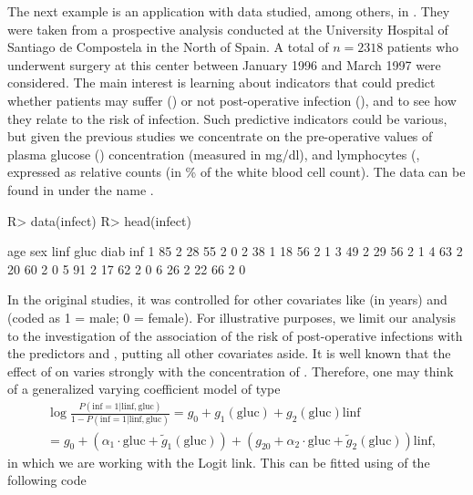 The next example is an application with data studied, among others, in \citet{RS2010}. 
They were taken from a prospective analysis conducted at the University Hospital of Santiago de Compostela in the North of Spain. A total of $n=2318$ patients who underwent surgery at this center between January 1996 and March 1997 were considered. 
The main interest is learning about indicators that could predict whether patients may suffer () or not post-operative infection (), and to see how they relate to the risk of infection. 
Such predictive indicators could be various, but given the previous studies we concentrate on the pre-operative values of plasma glucose () concentration (measured in mg/dl), and lymphocytes (, expressed as relative counts (in \% of the white blood cell count). The data can be found in  under the name . 

\begin{Schunk}
\begin{Sinput}
R> data(infect)
R> head(infect)
\end{Sinput}
\begin{Soutput}
 age sex linf gluc diab inf
1  85   2   28   55    2   0
2  38   1   18   56    2   1
3  49   2   29   56    2   1
4  63   2   20   60    2   0
5  91   2   17   62    2   0
6  26   2   22   66    2   0
\end{Soutput}
\end{Schunk}

In the original studies, it was controlled for other covariates like   (in years) and   (coded as 1 = male; 0 = female). For illustrative purposes, we limit our analysis to the investigation of the association of the risk of post-operative infections   with the predictors   and  , putting all other covariates aside. It is well known that the effect of   on   varies strongly with the 
concentration of  . Therefore, one may think of a generalized varying coefficient model of type
\begin{align}
& \log \frac{P\left(\mbox{inf} = 1 \vert \mbox{linf},\mbox{gluc} \right)}{1-P\left( \mbox{inf} = 1 \vert
\mbox{linf}, \mbox{gluc} \right)}  = g_0 + g_1(\mbox{gluc}) + g_2 (\mbox{gluc})\mbox{linf} \nonumber \\
& = g_0 + \left(\alpha_{1} \cdot \mbox{gluc} + \tilde{g}_1(\mbox{gluc})\right) + \left(g_{20} + \alpha_{2} \cdot \mbox{gluc} + \tilde{g}_2(\mbox{gluc})\right)\mbox{linf}, \label{ipo2}
\end{align}
in which we are working with the Logit link. This can be fitted using of the following code

